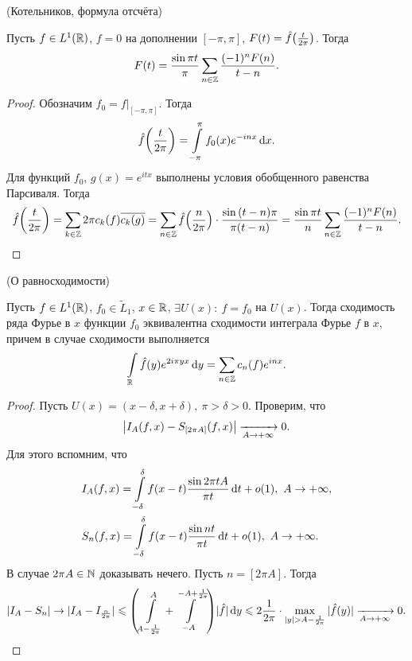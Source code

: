 \begin{theorem}(Котельников, формула отсчёта)
    
    Пусть $f \in L^1(\R)$, $f = 0$ на дополнении $[-\pi, \pi]$, $F(t) =
    \hat{f}\parens*{\frac{t}{2\pi}}$. Тогда
    \[
        F(t) = \frac{\sin{\pi t}}{\pi} \sum_{n \in \bZ}{\frac{(-1)^n F(n)}{t - n}}
    .\]
\end{theorem}
\begin{proof}
    Обозначим $f_0 = f\big|_{[-\pi, \pi]}$. Тогда
    \begin{align*}
        \hat{f}\parens*{\frac{t}{2\pi}} = \intl_{-\pi}^\pi{f_0(x) e^{-inx} \dd x}
    .\end{align*}
    Для функций $f_0$, $g(x) = e^{itx}$ выполнены условия обобщенного равенства
    Парсиваля. Тогда
    \[
        \hat{f}\parens*{\frac{t}{2\pi}} = \sum_{k \in \bZ}{2\pi c_k(f) \overline{c_k(g)}}
        = \sum_{n \in \bZ}{\hat{f}\parens*{\frac{n}{2\pi}} \cdot \frac{\sin{(t - n) \pi}}
        {\pi (t - n)}} = \frac{\sin{\pi t}}{n} \sum_{n \in \bZ}{\frac{(-1)^n F(n)}{t - n}}
    .\]
\end{proof}

\begin{theorem}(О равносходимости)
   
    Пусть $f \in L^1(\R)$, $f_0 \in \widetilde{L}_1$, $x \in \R$,
    $\exists U(x)\colon~ f = f_0$ на $U(x)$. Тогда сходимость ряда
    Фурье в $x$ функции $f_0$ эквивалентна сходимости интеграла Фурье
    $f$ в $x$, причем в случае сходимости выполняется
    \[
        \intl_{\R}{\hat{f}(y) e^{2i\pi yx} \dd y} = \sum_{n \in \bZ}{c_n(f) e^{inx}}
    .\]
\end{theorem}
\begin{proof}
    Пусть $U(x) = (x - \delta, x + \delta),~ \pi > \delta > 0$. Проверим, что
    \[
        \abs*{I_A(f, x) - S_{[2\pi A]}(f, x)} \xrightarrow[A \to +\infty]{} 0
    .\]
    Для этого вспомним, что
    \begin{align*}
        &I_A(f, x) = \intl_{-\delta}^\delta{f(x - t) \frac{\sin{2 \pi tA}}{\pi t} \dd t}
        + o(1),~ A \to +\infty, \\ 
        &S_n(f, x) = \intl_{-\delta}^\delta{f(x - t) \frac{\sin{nt}}{\pi t} \dd t}
        + o(1),~ A \to +\infty
    .\end{align*}
    В случае $2\pi A \in \bN$ доказывать нечего. Пусть $n = [2\pi A]$. Тогда
    \[
        |I_A - S_n| \to |I_A - I_{\frac{n}{2\pi}}| \leqslant 
        \parens*{\intl_{A - \frac{1}{2\pi}}^{A}
        + \intl_{-A}^{-A + \frac{1}{2\pi}}} |\hat{f}| \dd y \leqslant
        2 \frac{1}{2\pi} \cdot \max_{|y| > A - \frac{1}{2\pi}}{|\hat{f}(y)|}
        \xrightarrow[A \to +\infty]{} 0
    .\]
\end{proof}

